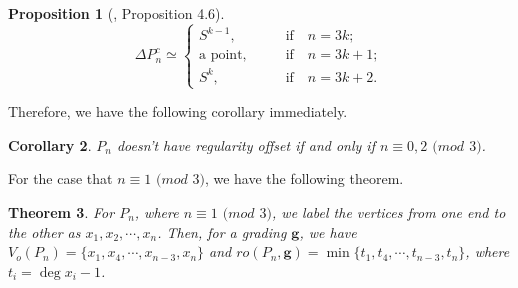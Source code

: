 \documentclass[dvipsnames,10pt]{article}
\newtheorem{theorem}{Theorem}[section]
\newtheorem{proposition}[theorem]{Proposition}
\newtheorem{cor}[theorem]{Corollary}
\begin{document}
\begin{proposition}[\cite{kozlov1999complexes}, Proposition 4.6]
\begin{equation*}
    \Delta P_n^c\simeq \left\{\begin{matrix}
 S^{k-1},\qquad &\text{if}\quad  n=3k;\\
 \text{a point,}\qquad &\text{if}\quad  n=3k+1;\\
 S^k,\qquad &\text{if}\quad  n=3k+2.
\end{matrix}\right.
\end{equation*}
\end{proposition}
 Therefore, we have the following corollary immediately.
 \begin{cor}
     $P_n$ doesn't have regularity offset if and only if $n\equiv0,2$ $(mod$ $3)$.
 \end{cor}
For the case that $n\equiv1$ $(mod$ $3)$, we have the following theorem.
\begin{theorem}
    For $P_n$, where $n\equiv1$ $(mod$ $3)$, we label the vertices from one end to the other as $x_1,x_2,\cdots,x_n$. Then, for a grading $\mathbf{g}$, we have $V_o(P_n)=\{x_1,x_4,\cdots,x_{n-3},x_n\}$ and $ro(P_n,\mathbf{g})=\min\{t_1,t_4,\cdots,t_{n-3},t_n\}$, where $t_i=\deg x_i-1$.
\end{theorem}
\end{document}
